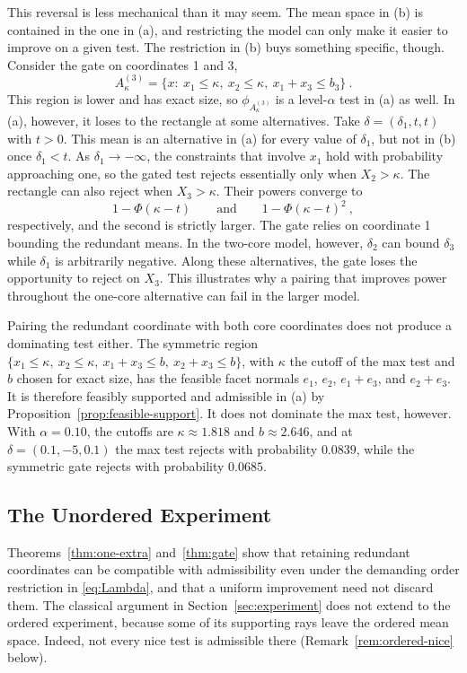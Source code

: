 \documentclass[11pt]{article}
\newcommand{\red}[1]{{\color{red}#1}} %
\numberwithin{equation}{section}
\theoremstyle{definition}
\begin{document}
This reversal is less mechanical than it may seem. The mean space in (b) is contained in the one in (a), and restricting the model can only make it easier to improve on a given test. The restriction in (b) buys something specific, though. Consider the gate on coordinates 1 and 3,
\[
A_\kappa^{(3)}=\{x:\ x_1\le\kappa,\ x_2\le\kappa,\ x_1+x_3\le b_3\}~.
\]
This region is lower and has exact size, so $\phi_{A_\kappa^{(3)}}$ is a level-$\alpha$ test in (a) as well. In (a), however, it loses to the rectangle at some alternatives. Take $\delta=(\delta_1,t,t)$ with $t>0$. This mean is an alternative in (a) for every value of $\delta_1$, but not in (b) once $\delta_1<t$. As $\delta_1\to-\infty$, the constraints that involve $x_1$ hold with probability approaching one, so the gated test rejects essentially only when $X_2>\kappa$. The rectangle can also reject when $X_3>\kappa$. Their powers converge to
\[
1-\Phi(\kappa-t)
\qquad\text{and}\qquad
1-\Phi(\kappa-t)^2~,
\]
respectively, and the second is strictly larger. The gate relies on coordinate 1 bounding the redundant means. In the two-core model, however, $\delta_2$ can bound $\delta_3$ while $\delta_1$ is arbitrarily negative. Along these alternatives, the gate loses the opportunity to reject on $X_3$. This illustrates why a pairing that improves power throughout the one-core alternative can fail in the larger model.

Pairing the redundant coordinate with both core coordinates does not produce a dominating test either. The symmetric region $\{x_1\le\kappa,\ x_2\le\kappa,\ x_1+x_3\le b,\ x_2+x_3\le b\}$, with $\kappa$ the cutoff of the max test and $b$ chosen for exact size, has the feasible facet normals $e_1$, $e_2$, $e_1+e_3$, and $e_2+e_3$. It is therefore feasibly supported and admissible in (a) by Proposition~\ref{prop:feasible-support}. It does not dominate the max test, however. With $\alpha=0.10$, the cutoffs are $\kappa\approx1.818$ and $b\approx2.646$, and at $\delta=(0.1,-5,0.1)$ the max test rejects with probability $0.0839$, while the symmetric gate rejects with probability $0.0685$.


\subsection{The Unordered Experiment}\label{sec:unordered-experiment}

Theorems~\ref{thm:one-extra} and~\ref{thm:gate} show that retaining redundant coordinates can be compatible with admissibility even under the demanding order restriction in \eqref{eq:Lambda}, and that a uniform improvement need not discard them. \red{The classical argument in Section~\ref{sec:experiment} does not extend to the ordered experiment, because some of its supporting rays leave the ordered mean space. Indeed, not every nice test is admissible there (Remark~\ref{rem:ordered-nice} below).}
\end{document}
